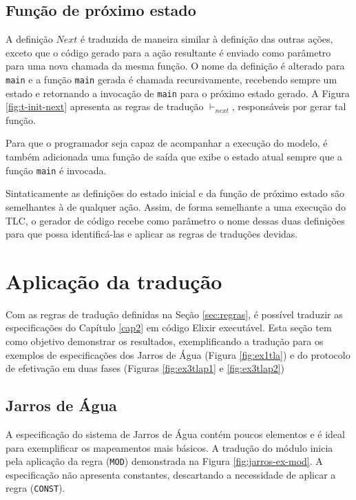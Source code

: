 \subsection{Função de próximo estado}

A definição $Next$ é traduzida de maneira similar à definição das outras ações,
exceto que o código gerado para a ação resultante é enviado como parâmetro para
uma nova chamada da mesma função. O nome da definição é alterado para
\texttt{main} e a função \texttt{main} gerada é chamada recursivamente,
recebendo sempre um estado e retornando a invocação de \texttt{main} para o
próximo estado gerado. A Figura \ref{fig:t-init-next} apresenta as regras de
tradução $\vdash_{next}$, responsáveis por gerar tal função.

Para que o programador seja capaz de acompanhar a execução do modelo, é também
adicionada uma função de saída que exibe o estado atual sempre que a função
\texttt{main} é invocada.



Sintaticamente as definições do estado inicial e da função de próximo estado são
semelhantes à de qualquer ação. Assim, de forma semelhante a uma execução do
TLC, o gerador de código recebe como parâmetro o nome dessas duas definições
para que possa identificá-las e aplicar as regras de traduções devidas.

\section{Aplicação da tradução}
\label{sec:validacao}

Com as regras de tradução definidas na Seção \ref{sec:regras}, é possível
traduzir as especificações do Capítulo \ref{cap2} em código Elixir executável.
Esta seção tem como objetivo demonstrar os resultados, exemplificando a tradução
para os exemplos de especificações dos Jarros de Água (Figura \ref{fig:ex1tla})
e do protocolo de efetivação em duas fases (Figuras \ref{fig:ex3tlap1} e
\ref{fig:ex3tlap2})

\subsection{Jarros de Água}


A especificação do sistema de Jarros de Água contém poucos elementos e é ideal
para exemplificar os mapeamentos mais básicos. A tradução do módulo inicia pela
aplicação da regra (\texttt{MOD}) demonstrada na Figura \ref{fig:jarros-ex-mod}.
A especificação não apresenta constantes, descartando a necessidade de aplicar a
regra (\texttt{CONST}).

